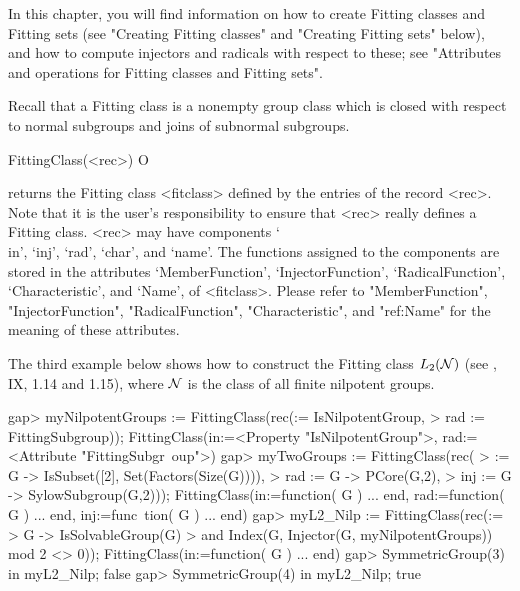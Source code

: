 
In this chapter, you will find information on how to create 
Fitting classes and Fitting sets (see "Creating Fitting classes" and
"Creating Fitting sets" below), and how to compute injectors and radicals
with respect to these;  see "Attributes and operations for Fitting classes
and Fitting sets".


\null


Recall that a Fitting class is a nonempty group class which is closed with respect
to normal subgroups and joins of subnormal subgroups.

\>FittingClass(<rec>) O

returns the Fitting class <fitclass> defined by the entries of the record
<rec>. Note that it is the user's responsibility to ensure that <rec> really
defines a Fitting class.
<rec> may have components `\\in', `inj', `rad', `char', and `name'. The
functions assigned to the components are stored in the attributes
`MemberFunction', `InjectorFunction',
`RadicalFunction', `Characteristic', and `Name', of <fitclass>. Please refer
to "MemberFunction",  "InjectorFunction", "RadicalFunction",
"Characteristic", and "ref:Name" for the meaning of these attributes.


 The third example below shows how to construct
the Fitting class $L_2({\cal N})$ (see \cite{DH92}, IX, 1.14 and 1.15), where
$\cal N$ is the class of all finite nilpotent groups.

\beginexample
gap> myNilpotentGroups := FittingClass(rec(\in := IsNilpotentGroup,
>    rad := FittingSubgroup));
FittingClass(in:=<Property "IsNilpotentGroup">, rad:=<Attribute "FittingSubgr\
oup">)
gap> myTwoGroups := FittingClass(rec(
>    \in := G -> IsSubset([2], Set(Factors(Size(G)))), 
>    rad :=  G -> PCore(G,2),
>    inj := G -> SylowSubgroup(G,2)));
FittingClass(in:=function( G ) ... end, rad:=function( G ) ... end, inj:=func\
tion( G ) ... end)
gap> myL2_Nilp := FittingClass(rec(\in := 
>     G -> IsSolvableGroup(G) 
>          and Index(G, Injector(G, myNilpotentGroups)) mod 2 <> 0));
FittingClass(in:=function( G ) ... end)
gap> SymmetricGroup(3) in myL2_Nilp;
false
gap> SymmetricGroup(4) in myL2_Nilp;
true   
\endexample

